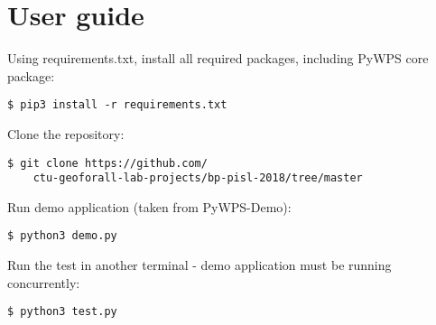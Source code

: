 \chapter{User guide}
\label{user-guide}


Using requirements.txt, install all required packages, including PyWPS core package: 
\begin{lstlisting}
$ pip3 install -r requirements.txt
\end{lstlisting}

Clone the repository:

\begin{lstlisting}
$ git clone https://github.com/
	ctu-geoforall-lab-projects/bp-pisl-2018/tree/master
\end{lstlisting}

Run demo application (taken from PyWPS-Demo):

\begin{lstlisting}
$ python3 demo.py
\end{lstlisting}

Run the test in another terminal - demo application must be running concurrently:

\begin{lstlisting}
$ python3 test.py
\end{lstlisting}






%
%
%
%
%




